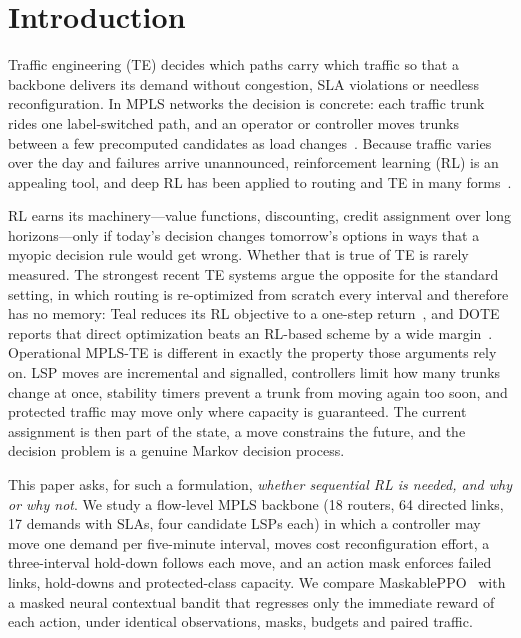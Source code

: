 \section{Introduction}
\label{sec:intro}

Traffic engineering (TE) decides which paths carry which traffic so that a
backbone delivers its demand without congestion, SLA violations or
needless reconfiguration. In MPLS networks the decision is concrete: each
traffic trunk rides one label-switched path, and an operator or controller
moves trunks between a few precomputed candidates as load
changes~\citep{rfc2702,rfc3209}. Because traffic varies over the day and
failures arrive unannounced, reinforcement learning (RL) is an appealing
tool, and deep RL has been applied to routing and TE in many
forms~\citep{valadarsky2017learning,xu2018drlte,zhang2020cfrrl,almasan2022drlgnn,bernardez2023magnneto}.

RL earns its machinery---value functions, discounting, credit assignment
over long horizons---only if today's decision changes tomorrow's options in
ways that a myopic decision rule would get wrong. Whether that is true of TE
is rarely measured. The strongest recent TE systems argue the opposite for
the standard setting, in which routing is re-optimized from scratch every
interval and therefore has no memory: Teal reduces its RL objective to a
one-step return~\citep{xu2023teal}, and DOTE reports that direct optimization
beats an RL-based scheme by a wide margin~\citep{perry2023dote}. Operational
MPLS-TE is different in exactly the property those arguments rely on. LSP
moves are incremental and signalled, controllers limit how many trunks change
at once, stability timers prevent a trunk from moving again too soon, and
protected traffic may move only where capacity is guaranteed. The current
assignment is then part of the state, a move constrains the future, and the
decision problem is a genuine Markov decision process.

This paper asks, for such a formulation, \emph{whether sequential RL is
needed, and why or why not}. We study a flow-level MPLS backbone (18 routers,
64 directed links, 17 demands with SLAs, four candidate LSPs each) in which a
controller may move one demand per five-minute interval, moves cost
reconfiguration effort, a three-interval hold-down follows each move, and an
action mask enforces failed links, hold-downs and protected-class capacity.
We compare MaskablePPO~\citep{schulman2017ppo,huang2022masking} with a masked
neural contextual bandit that regresses only the immediate reward of each
action, under identical observations, masks, budgets and paired traffic.


